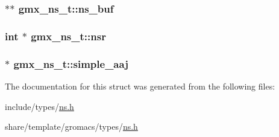 \hypertarget{structgmx__ns__t_ab1d70e301f74eddfcc62bc89fe44bf9f}{
\subsubsection[{ns\-\_\-buf}]{ $\ast$$\ast$ {\bf gmx\-\_\-ns\-\_\-t\-::ns\-\_\-buf}}}\label{structgmx__ns__t_ab1d70e301f74eddfcc62bc89fe44bf9f}
\hypertarget{structgmx__ns__t_adbc8fc07eb27b31cd7d9846ab9f3403a}{
\subsubsection[{nsr}]{\setlength{\rightskip}{0pt plus 5cm}int $\ast$ {\bf gmx\-\_\-ns\-\_\-t\-::nsr}}}\label{structgmx__ns__t_adbc8fc07eb27b31cd7d9846ab9f3403a}
\hypertarget{structgmx__ns__t_a6e3e9609cef2011914d3ae20c68fe04c}{
\subsubsection[{simple\-\_\-aaj}]{ $\ast$ {\bf gmx\-\_\-ns\-\_\-t\-::simple\-\_\-aaj}}}\label{structgmx__ns__t_a6e3e9609cef2011914d3ae20c68fe04c}


\-The documentation for this struct was generated from the following files\-:\begin{DoxyCompactItemize}
\item 
include/types/\hyperlink{include_2types_2ns_8h}{ns.\-h}\item 
share/template/gromacs/types/\hyperlink{share_2template_2gromacs_2types_2ns_8h}{ns.\-h}\end{DoxyCompactItemize}
